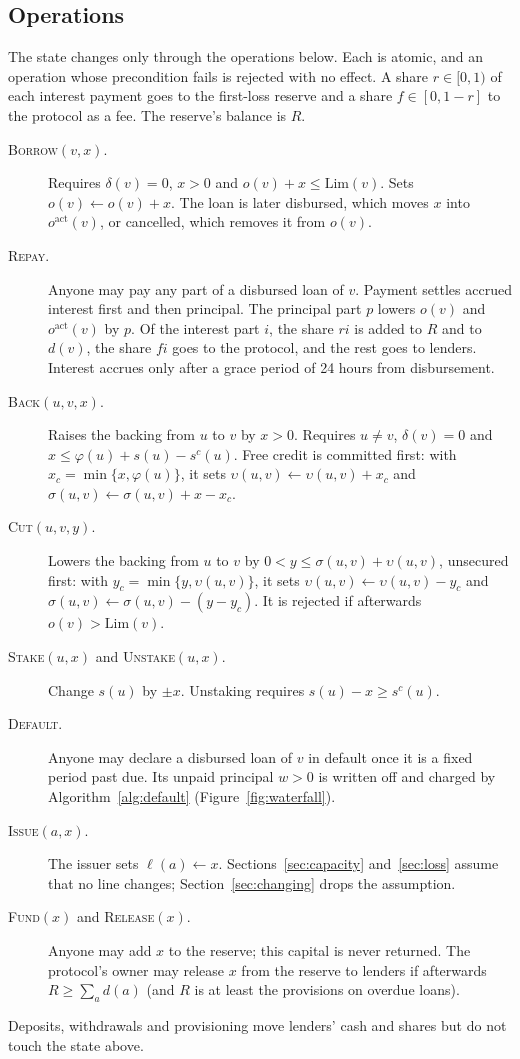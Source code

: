 \documentclass[acmsmall,nonacm,screen]{acmart}
\theoremstyle{acmdefinition}%
\newcommand{\Lim}{\mathrm{Lim}}
\newcommand{\act}{\mathrm{act}}
\newcommand{\Op}[1]{\textsc{#1}}
\begin{document}
\subsection{Operations}

The state changes only through the operations below. Each is atomic, and an operation whose
precondition fails is rejected with no effect. A share $r\in[0,1)$ of each interest payment goes to
the first-loss reserve and a share $f\in[0,1-r]$ to the protocol as a fee. The reserve's balance is
$R$.
\begin{description}
\item[\Op{Borrow}$(v,x)$.] Requires $\delta(v)=0$, $x>0$ and $o(v)+x\le\Lim(v)$. Sets
  $o(v)\gets o(v)+x$. The loan is later disbursed, which moves $x$ into $o^{\act}(v)$, or
  cancelled, which removes it from $o(v)$.
\item[\Op{Repay}.] Anyone may pay any part of a disbursed loan of $v$. Payment settles accrued
  interest first and then principal. The principal part $p$ lowers $o(v)$ and $o^{\act}(v)$ by $p$.
  Of the interest part $i$, the share $ri$ is added to $R$ and to $d(v)$, the share $fi$ goes to
  the protocol, and the rest goes to lenders. Interest accrues only after a grace period of 24
  hours from disbursement.
\item[\Op{Back}$(u,v,x)$.] Raises the backing from $u$ to $v$ by $x>0$. Requires $u\ne v$,
  $\delta(v)=0$ and $x\le\varphi(u)+s(u)-s^c(u)$. Free credit is committed first: with
  $x_c=\min\{x,\varphi(u)\}$, it sets $\upsilon(u,v)\gets\upsilon(u,v)+x_c$ and
  $\sigma(u,v)\gets\sigma(u,v)+x-x_c$.
\item[\Op{Cut}$(u,v,y)$.] Lowers the backing from $u$ to $v$ by $0<y\le\sigma(u,v)+\upsilon(u,v)$,
  unsecured first: with $y_c=\min\{y,\upsilon(u,v)\}$, it sets $\upsilon(u,v)\gets\upsilon(u,v)-y_c$
  and $\sigma(u,v)\gets\sigma(u,v)-(y-y_c)$. It is rejected if afterwards $o(v)>\Lim(v)$.
\item[\Op{Stake}$(u,x)$ and \Op{Unstake}$(u,x)$.] Change $s(u)$ by $\pm x$. Unstaking requires
  $s(u)-x\ge s^c(u)$.
\item[\Op{Default}.] Anyone may declare a disbursed loan of $v$ in default once it is a fixed period
  past due. Its unpaid principal $w>0$ is written off and charged by Algorithm~\ref{alg:default}
  (Figure~\ref{fig:waterfall}).
\item[\Op{Issue}$(a,x)$.] The issuer sets $\ell(a)\gets x$. Sections~\ref{sec:capacity}
  and~\ref{sec:loss} assume that no line changes; Section~\ref{sec:changing} drops the assumption.
\item[\Op{Fund}$(x)$ and \Op{Release}$(x)$.] Anyone may add $x$ to the reserve; this capital is
  never returned. The protocol's owner may release $x$ from the reserve to lenders if afterwards
  $R\ge\sum_a d(a)$ (and $R$ is at least the provisions on overdue loans).
\end{description}
Deposits, withdrawals and provisioning move lenders' cash and shares but do not touch the state
above.
\end{document}
